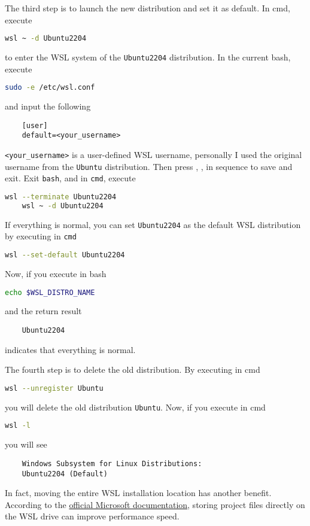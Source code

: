 \documentclass{report}
\begin{document}
The third step is to launch the new distribution and set it as default. In \textsf{cmd}, execute
\begin{lstlisting}[language=bash]
	wsl ~ -d Ubuntu2204
\end{lstlisting}
to enter the WSL system of the \texttt{Ubuntu2204} distribution. In the current \textsf{bash}, execute
\begin{lstlisting}[language=bash]
	sudo -e /etc/wsl.conf
\end{lstlisting}
and input the following
\begin{lstlisting}
	[user]
	default=<your_username>
\end{lstlisting}
\texttt{<your\_username>} is a user-defined WSL username, personally I used the original username from the \texttt{Ubuntu} distribution. Then press , , \keys{\enter} in sequence to save and exit. Exit \texttt{bash}, and in \texttt{cmd}, execute
\begin{lstlisting}[language=bash]
	wsl --terminate Ubuntu2204
	wsl ~ -d Ubuntu2204
\end{lstlisting}
If everything is normal, you can set \texttt{Ubuntu2204} as the default WSL distribution by executing in \texttt{cmd}
\begin{lstlisting}[language=bash]
	wsl --set-default Ubuntu2204
\end{lstlisting}
Now, if you execute in \textsf{bash}
\begin{lstlisting}[language=bash]
	echo $WSL_DISTRO_NAME
\end{lstlisting}
and the return result
\begin{lstlisting}
	Ubuntu2204
\end{lstlisting}
indicates that everything is normal.

The fourth step is to delete the old distribution. By executing in \textsf{cmd}
\begin{lstlisting}[language=bash]
	wsl --unregister Ubuntu
\end{lstlisting}
you will delete the old distribution \texttt{Ubuntu}. Now, if you execute in \textsf{cmd}
\begin{lstlisting}[language=bash]
	wsl -l
\end{lstlisting}
you will see
\begin{lstlisting}
	Windows Subsystem for Linux Distributions:
	Ubuntu2204 (Default)
\end{lstlisting}

In fact, moving the entire WSL installation location has another benefit. According to the \href{https://learn.microsoft.com/zh-cn/windows/wsl/filesystems#file-storage-and-performance-across-file-systems}{official Microsoft documentation}, storing project files directly on the WSL drive can improve performance speed.
\end{document}
